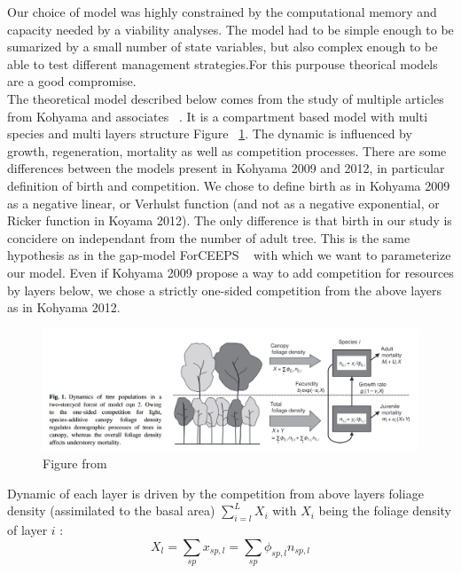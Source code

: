 \documentclass{article}
\begin{document}
Our choice of model was highly constrained by the computational memory and capacity needed by a viability analyses. The model had to be simple enough to be sumarized by a small number of state variables, but also complex enough to be able to test different management strategies.For this purpouse theorical models are a good compromise.\\

The theoretical model described below comes from the study of multiple articles from Kohyama and associates ~\autocite{kohyamaStratificationTheoryPlant2009, kohyamaOnesidedCompetitionLight2012}.
It is a compartment based model with multi species and multi layers structure Figure ~\ref{fig:fig_model}. The dynamic is influenced by growth, regeneration, mortality as well as competition processes. There are some differences between the models present in Kohyama 2009 and 2012, in particular definition of birth and competition. We chose to define birth as in Kohyama 2009 as a negative linear, or Verhulst function (and not as a negative exponential, or Ricker function in Koyama 2012). The only difference is that birth in our study is concidere on independant from the number of adult tree. This is the same hypothesis as in the gap-model ForCEEPS ~\autocite{morinUsingForestGap2020} with which we want to parameterize our model. Even if Kohyama 2009 propose a way to add competition for resources by layers below, we chose a strictly one-sided competition from the above layers as in Kohyama 2012.

\begin{figure}[h]
    \centering
    \includegraphics[width=\textwidth]{Figure/Fig_model_Kohyama.png}
    \caption{Figure from ~\autocite{kohyamaOnesidedCompetitionLight2012}}
    \label{fig:fig_model}
\end{figure}

Dynamic of each layer is driven by the competition from above layers foliage density (assimilated to the basal area) $\sum_{i = l}^{L} X_i$ with $X_i$ being the foliage density of layer $i$ :
\begin{equation}
    X_{l} = \sum_{sp} x_{sp,l} = \sum_{sp} \phi_{sp,l} n_{sp,l}
\end{equation}
\end{document}
